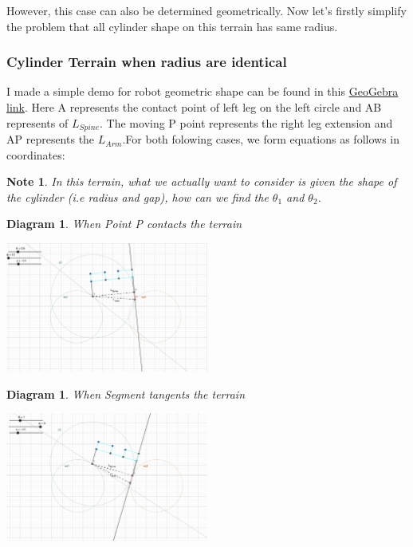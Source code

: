 \documentclass[11pt]{article}
\newtheorem{diagram}[statement]{Diagram}
\newtheorem{note}[statement]{Note}
\begin{document}
However, this case can also be determined geometrically. Now let's firstly simplify the problem
that all cylinder shape on this terrain has same radius. 

\subsubsection*{Cylinder Terrain when radius are identical}

I made a simple demo for robot geometric shape can be found in this \href{https://www.geogebra.org/classic/vzgc97bq}{GeoGebra link}.
Here A represents the contact point of left leg on the left circle and AB represents of \(L_{Spine}\). The
moving P point represents the right leg extension and AP represents the \(L_{Arm}\).For both folowing cases, 
we form equations as follows in coordinates:

\begin{note}
    In this terrain, what we actually want to consider is given the shape of the cylinder
    (i.e radius and gap), how can we find the \(\theta_1\) and \(\theta_2\).
\end{note}

\begin{diagram}
    When Point P contacts the terrain
\end{diagram}
\vspace{1ex} %
\begin{center}
    \includegraphics[width=0.5\textwidth]{figs/Cylinder-Case1.jpg} %
\end{center}

\begin{diagram}
    When Segment tangents the terrain
\end{diagram}
\vspace{1ex} %
\begin{center}
    \includegraphics[width=0.5\textwidth]{figs/Cylinder-Case2.jpg} %
\end{center}
\end{document}
